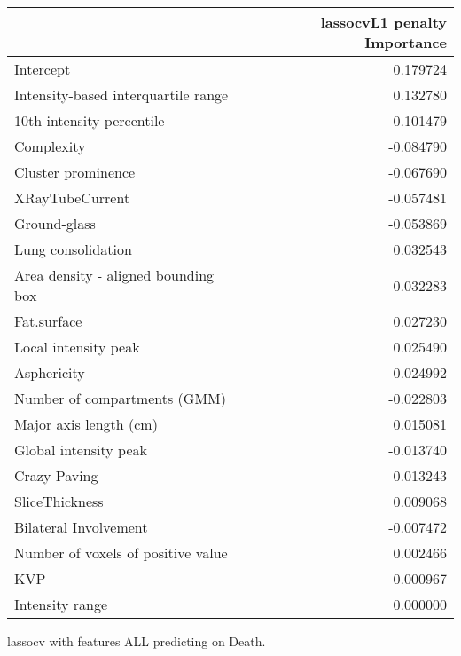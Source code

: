 {\begin{tabular}{lr}
\toprule
{} &  lassocvL1 penalty Importance \\
\midrule
Intercept                           &                      0.179724 \\
Intensity-based interquartile range &                      0.132780 \\
10th intensity percentile           &                     -0.101479 \\
Complexity                          &                     -0.084790 \\
Cluster prominence                  &                     -0.067690 \\
XRayTubeCurrent                     &                     -0.057481 \\
Ground-glass                        &                     -0.053869 \\
Lung consolidation                  &                      0.032543 \\
Area density - aligned bounding box &                     -0.032283 \\
Fat.surface                         &                      0.027230 \\
Local intensity peak                &                      0.025490 \\
Asphericity                         &                      0.024992 \\
Number of compartments (GMM)        &                     -0.022803 \\
Major axis length (cm)              &                      0.015081 \\
Global intensity peak               &                     -0.013740 \\
Crazy Paving                        &                     -0.013243 \\
SliceThickness                      &                      0.009068 \\
Bilateral Involvement               &                     -0.007472 \\
Number of voxels of positive value  &                      0.002466 \\
KVP                                 &                      0.000967 \\
Intensity range                     &                      0.000000 \\
\bottomrule
\end{tabular}

lassocv with features ALL predicting on Death.

}

